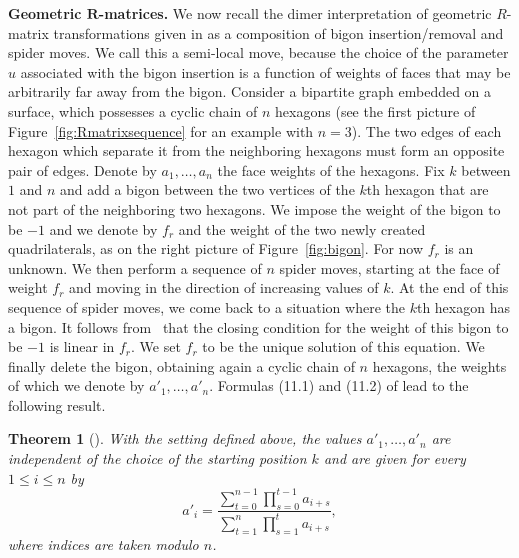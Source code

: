 \documentclass[pdftex]{sigma}
\numberwithin{equation}{section}
\newtheorem{Theorem}{Theorem}[section]
\begin{document}
	{\bf Geometric $\boldsymbol{R}$-matrices.}
	We now recall the dimer interpretation of geometric $R$-matrix transformations given in \cite[Section 11]{ILP1} as a composition of bigon insertion/removal and spider moves. We call this a semi-local move, because the choice of the parameter $u$ associated with the bigon insertion is a function of weights of faces that may be arbitrarily far away from the bigon. Consider a bipartite graph embedded on a surface, which possesses a cyclic chain of $n$ hexagons (see the first picture of Figure~\ref{fig:Rmatrixsequence} for an example with $n=3$). The two edges of each hexagon which separate it from the neighboring hexagons must form an opposite pair of edges. Denote by $a_1,\dots,a_n$ the face weights of the hexagons. Fix $k$ between $1$ and $n$ and add a bigon between the two vertices of the $k$th hexagon that are not part of the neighboring two hexagons. We impose the weight of the bigon to be $-1$ and we denote by $f_r$ and  the weight of the two newly created quadrilaterals, as on the right picture of Figure~\ref{fig:bigon}. For now $f_r$ is an unknown. We then perform a sequence of $n$ spider moves, starting at the face of weight $f_r$ and moving in the direction of increasing values of $k$. At the end of this sequence of spider moves, we come back to a situation where the $k$th hexagon has a bigon. It follows from~\cite{ILP1} that the closing condition for the weight of this bigon to be $-1$ is linear in $f_r$. We set $f_r$ to be the unique solution of this equation. We finally delete the bigon, obtaining again a cyclic chain of $n$ hexagons, the weights of which we denote by $a'_1,\dots,a'_n$. Formulas (11.1) and (11.2) of \cite{ILP1} lead to the following result.
	
	\begin{Theorem}[\cite{ILP1}]
		\label{thm:ILP}
		With the setting defined above, the values $a'_1,\dots,a'_n$ are independent of the choice of the starting position $k$ and are given for every $1\leq i \leq n$ by
		\begin{equation}
			\label{eq:Rmatrix}
			a'_i=\frac{\sum\limits_{t=0}^{n-1}\prod\limits_{s=0}^{t-1}a_{i+s}}{\sum\limits_{t=1}^{n}\prod\limits_{s=1}^{t}a_{i+s}},
		\end{equation}
		where indices are taken modulo $n$.
	\end{Theorem}
	
\end{document}
